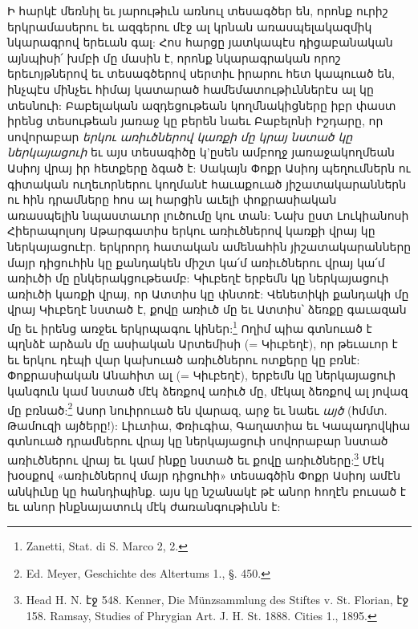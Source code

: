 \documentclass{article}
\begin{document}
{Ի հարկէ մեռնիլ եւ յարութիւն առնուլ տեսագծեր են, որոնք ուրիշ երկրամասերու եւ ազգերու մէջ ալ կրնան առասպելակազմիկ նկարագրով երեւան գալ: Հոս հարցը յատկապէս դիցաբանական այնպիսի՛ խմբի մը մասին է, որոնք նկարագրական որոշ երեւոյթներով եւ տեսագծերով սերտիւ իրարու հետ կապուած են, ինչպէս մինչեւ հիմայ կատարած համեմատութիւններէս ալ կը տեսնուի: Բաբելական ազդեցութեան կողմնակիցները իբր փաստ իրենց տեսութեան յառաջ կը բերեն նաեւ Բաբելոնի Իշդարը, որ սովորաբար \emph{երկու առիւծներով կառքի մը կրայ նստած կը ներկայացուի} եւ այս տեսագիծը կ'ըսեն ամբողջ յառաջակողմեան Ասիոյ վրայ իր հետքերը ձգած է: Սակայն Փոքր Ասիոյ պեղումներն ու գիտական ուղեւորներու կողմանէ հաւաքուած յիշատակարաններն ու հին դրամները հոս ալ հարցին աւելի փոքրասիական առասպելին նպաստաւոր լուծումը կու տան: Նախ ըստ Լուկիանոսի Հիերապոլսոյ Աթարգատիս երկու առիւծներով կառքի վրայ կը ներկայացուէր. երկրորդ հատական ամենահին յիշատակարանները մայր դիցուհին կը քանդակեն միշտ կա՛մ առիւծներու վրայ կա՛մ առիւծի մը ընկերակցութեամբ: Կիւբեղէ երբեմն կը ներկայացուի առիւծի կառքի վրայ, որ Ատտիս կը փնտռէ: Վենետիկի քանդակի մը վրայ Կիւբեղէ նստած է, քովը առիւծ մը եւ Ատտիս՝ ձեռքը գաւազան մը եւ իրենց առջեւ երկրպագու կիներ:\footnote{Zanetti, Stat. di S. Marco 2, 2.} Ողիմ պիա գտնուած է պղնձէ արձան մը ասիական Արտեմիսի (= Կիւբեղէ), որ թեւաւոր է եւ երկու դէպի վար կախուած առիւծներու ոտքերը կը բռնէ: Փոքրասիական Անահիտ ալ (= Կիւբեղէ), երբեմն կը ներկայացուի կանգուն կամ նստած մէկ ձեռքով առիւծ մը, մէկալ ձեռքով ալ յովազ մը բռնած:\footnote{Ed. Meyer, Geschichte des Altertums 1., §. 450.} Ասոր նուիրուած են վարազ, արջ եւ նաեւ \emph{այծ} (հմմտ. Թամուզի այծերը!): Լիւտիա, Փռիւգիա, Գաղատիա եւ Կապադովկիա գտնուած դրամներու վրայ կը ներկայացուի սովորաբար նստած առիւծներու վրայ եւ կամ ինքը նստած եւ քովը առիւծները:\footnote{Head H. N. էջ 548. Kenner, Die Münzsammlung des Stiftes v. St. Florian, էջ 158. Ramsay, Studies of Phrygian Art. J. H. St. 1888. Cities 1., 1895.} Մէկ խօսքով «առիւծներով մայր դիցուհի» տեսագծին Փոքր Ասիոյ ամէն անկիւնը կը հանդիպինք. այս կը նշանակէ թէ անոր հողէն բուսած է եւ անոր ինքնայատուկ մէկ ժառանգութիւնն է:

}
\end{document}
